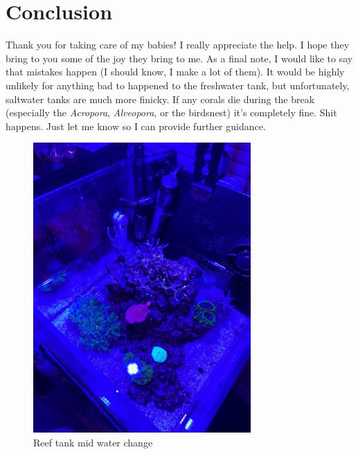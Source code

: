 \documentclass{report}
\begin{document}
\newpage
\chapter{Conclusion}
Thank you for taking care of my babies! I really appreciate the help. I hope they bring to you some of the joy they bring to me. As a final note, I would like to say that mistakes happen (I should know, I make a lot of them). It would be highly unlikely for anything bad to happened to the freshwater tank, but unfortunately, saltwater tanks are much more finicky. If any corals die during the break (especially the \textit{Acropora}, \textit{Alveopora}, or the birdsnest) it's completely fine. Shit happens. Just let me know so I can provide further guidance.

\begin{figure}[H]
    \centering
    \includegraphics[width=0.74125\textwidth, angle=-90]{EmptyAquarium.jpg}
    \caption{Reef tank mid water change}
\end{figure}
\end{document}
